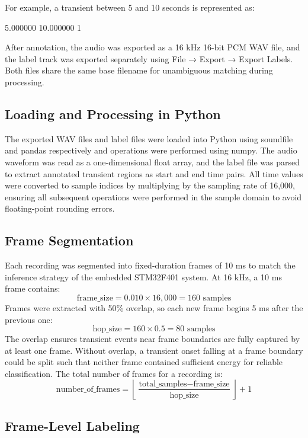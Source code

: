 For example, a transient between 5 and 10 seconds is represented as:

5.000000 10.000000 1

After annotation, the audio was exported as a 16 kHz 16-bit PCM WAV file, and the label track was exported separately using File → Export → Export Labels. Both files share the same base filename for unambiguous matching during processing.


\subsection{Loading and Processing in Python}

The exported WAV files and label files were loaded into Python using soundfile and pandas respectively and operations were performed using numpy. The audio waveform was read as a one-dimensional float array, and the label file was parsed to extract annotated transient regions as start and end time pairs. All time values were converted to sample indices by multiplying by the sampling rate of 16,000, ensuring all subsequent operations were performed in the sample domain to avoid floating-point rounding errors.


\subsection{Frame Segmentation}

Each recording was segmented into fixed-duration frames of 10 ms to match the inference strategy of the embedded STM32F401 system. At 16 kHz, a 10 ms frame contains:
\[
\text{frame\_size} = 0.010 \times 16,\!000 = 160 \text{ samples}
\]
Frames were extracted with 50\% overlap, so each new frame begins 5 ms after the previous one:
\[
\text{hop\_size} = 160 \times 0.5 = 80 \text{ samples}
\]
The overlap ensures transient events near frame boundaries are fully captured by at least one frame. Without overlap, a transient onset falling at a frame boundary could be split such that neither frame contained sufficient energy for reliable classification. The total number of frames for a recording is:
\begin{equation}    
    \text{number\_of\_frames} =
    \left\lfloor
    \frac{\text{total\_samples} - \text{frame\_size}}
    {\text{hop\_size}}
    \right\rfloor + 1
\end{equation}

\subsection{Frame-Level Labeling}

